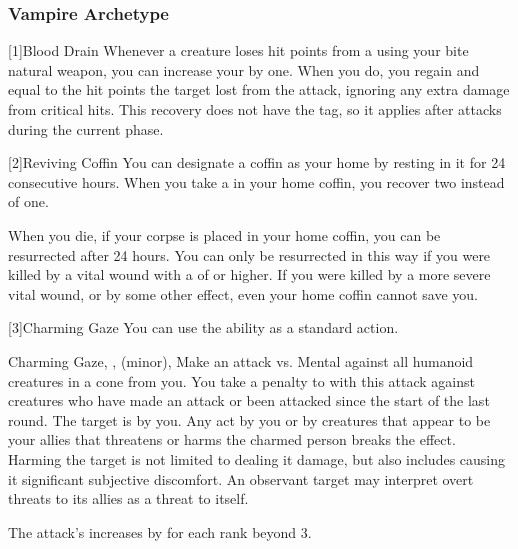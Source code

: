         \subsubsection{Vampire Archetype}

            [1]{Blood Drain} Whenever a creature loses hit points from a  using your bite natural weapon, you can increase your  by one.
            When you do, you regain  and  equal to the hit points the target lost from the attack, ignoring any extra damage from critical hits.
            This recovery does not have the  tag, so it applies after attacks during the current phase.

            [2]{Reviving Coffin} You can designate a coffin as your home by resting in it for 24 consecutive hours.
            When you take a  in your home coffin, you recover two  instead of one.

            When you die, if your corpse is placed in your home coffin, you can be resurrected after 24 hours.
            You can only be resurrected in this way if you were killed by a vital wound with a  of  or higher.
            If you were killed by a more severe vital wound, or by some other effect, even your home coffin cannot save you.

            [3]{Charming Gaze} You can use the  ability as a standard action.
            \begin{magicalsustainability}{Charming Gaze}{, ,  (minor), }
                \rankline
                Make an attack vs. Mental against all humanoid creatures in a \largearea cone from you.
                You take a  penalty to  with this attack against creatures who have made an attack or been attacked since the start of the last round.
                \hit The target is \charmed by you.
                Any act by you or by creatures that appear to be your allies that threatens or harms the charmed person breaks the effect.
                Harming the target is not limited to dealing it damage, but also includes causing it significant subjective discomfort.
                An observant target may interpret overt threats to its allies as a threat to itself.

                \rankline

                \noindent The attack's  increases by  for each rank beyond 3.
            \end{magicalsustainability}

